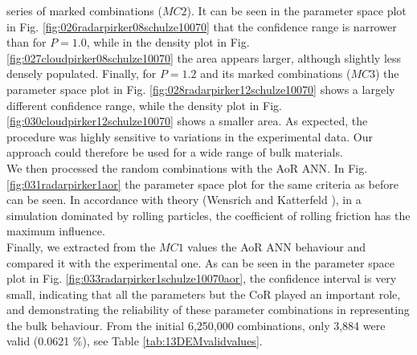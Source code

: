 series of marked combinations ($MC2$).
It can be seen in the parameter space plot in Fig.
\ref{fig:026radarpirker08schulze10070} that the confidence range is narrower
than for $P=1.0$, while in the density plot in Fig. 
\ref{fig:027cloudpirker08schulze10070} the area
appears larger, although slightly less densely populated. Finally, for $P=1.2$
and its marked combinations ($MC3$) the parameter space plot in Fig.
\ref{fig:028radarpirker12schulze10070} shows a largely different confidence
range, while the density plot in Fig. \ref{fig:030cloudpirker12schulze10070} 
shows a smaller area. As expected, the procedure was highly sensitive to
variations in the experimental data.
Our approach could therefore be used
for a wide range of bulk materials.\\
We then processed the random combinations with the \acs{AoR} \acs{ANN}. In Fig.
\ref{fig:031radarpirker1aor} the parameter space plot for the same criteria as
before can be seen.
In accordance with theory (Wensrich and Katterfeld \cite{RefWorks:87}), in a simulation dominated
by rolling particles, the coefficient of rolling friction has the maximum
influence. \\
Finally, we extracted from the $MC1$ values the \acs{AoR} \acs{ANN} behaviour
and compared it with the experimental one.
As can be seen in the parameter space plot in Fig.
\ref{fig:033radarpirker1schulze10070aor}, the confidence interval is very small,
indicating that all the parameters but the \acs{CoR} played an important role, 
and demonstrating the reliability of these parameter
combinations in representing the bulk behaviour.
From the initial 6,250,000 combinations, only 3,884 were valid (0.0621
\%), see Table \ref{tab:13DEMvalidvalues}.








